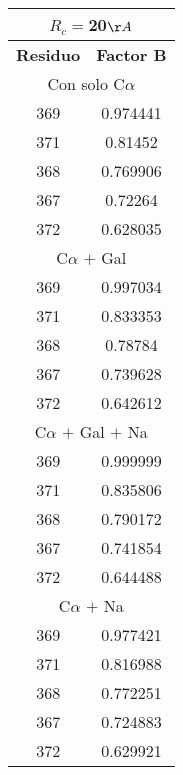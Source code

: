 \begin{tabular}[c]{|c|c|}
\multicolumn{2}{c}{$R_c=$20$\AA$}\\\hline
\textbf{Residuo}&\textbf{Factor B}\\\hline
\multicolumn{2}{c}{Con solo C$\alpha$}\\\hline
       369&  0.974441\\
       371&   0.81452\\
       368&  0.769906\\
       367&   0.72264\\
       372&  0.628035\\
\hline
\multicolumn{2}{c}{C$\alpha$ $+$ Gal}\\\hline
       369&  0.997034\\
       371&  0.833353\\
       368&   0.78784\\
       367&  0.739628\\
       372&  0.642612\\
\hline
\multicolumn{2}{c}{C$\alpha$ $+$ Gal $+$ Na}\\\hline
       369&  0.999999\\
       371&  0.835806\\
       368&  0.790172\\
       367&  0.741854\\
       372&  0.644488\\
\hline
\multicolumn{2}{c}{C$\alpha$ $+$ Na}\\\hline
       369&  0.977421\\
       371&  0.816988\\
       368&  0.772251\\
       367&  0.724883\\
       372&  0.629921\\
\hline
\end{tabular}
